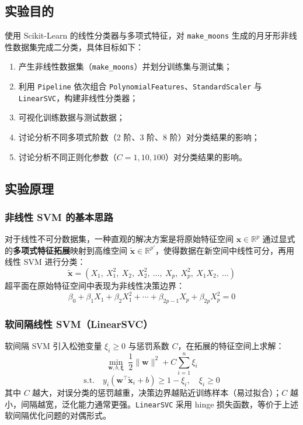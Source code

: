 \documentclass[10.5pt]{config}
\begin{document}
\subsection{实验目的}
使用 Scikit-Learn 的线性分类器与多项式特征，对 \texttt{make\_moons} 生成的月牙形非线性数据集完成二分类，具体目标如下：
\begin{enumerate}
    \item 产生非线性数据集（\texttt{make\_moons}）并划分训练集与测试集；
    \item 利用 \texttt{Pipeline} 依次组合 \texttt{PolynomialFeatures}、\texttt{StandardScaler} 与 \texttt{LinearSVC}，构建非线性分类器；
    \item 可视化训练数据与测试数据；
    \item 讨论分析不同多项式阶数（2 阶、3 阶、8 阶）对分类结果的影响；
    \item 讨论分析不同正则化参数（$C=1,10,100$）对分类结果的影响。
\end{enumerate}

\subsection{实验原理}

\subsubsection{非线性 SVM 的基本思路}
对于线性不可分数据集，一种直观的解决方案是将原始特征空间 $\mathbf{x}\in\mathbb{R}^p$ 通过显式的\textbf{多项式特征拓展}映射到高维空间 $\tilde{\mathbf{x}}\in\mathbb{R}^{p'}$，使得数据在新空间中线性可分，再用线性 SVM 进行分类：
$$\tilde{\mathbf{x}} = (X_1,\ X_1^2,\ X_2,\ X_2^2,\ \ldots,\ X_p,\ X_p^2,\ X_1 X_2,\ \ldots)$$
超平面在原始特征空间中表现为非线性决策边界：
$$\beta_0 + \beta_1 X_1 + \beta_2 X_1^2 + \cdots + \beta_{2p-1} X_p + \beta_{2p} X_p^2 = 0$$

\subsubsection{软间隔线性 SVM（LinearSVC）}
软间隔 SVM 引入松弛变量 $\xi_i \geq 0$ 与惩罚系数 $C$，在拓展的特征空间上求解：
$$\min_{\mathbf{w},b,\boldsymbol{\xi}}\ \frac{1}{2}\|\mathbf{w}\|^2 + C\sum_{i=1}^{n}\xi_i$$
$$\text{s.t.}\quad y_i(\mathbf{w}^{\top}\tilde{\mathbf{x}}_i + b) \geq 1-\xi_i,\quad \xi_i\geq 0$$
其中 $C$ 越大，对误分类的惩罚越重，决策边界越贴近训练样本（易过拟合）；$C$ 越小，间隔越宽，泛化能力通常更强。\texttt{LinearSVC} 采用 hinge 损失函数，等价于上述软间隔优化问题的对偶形式。
\end{document}
